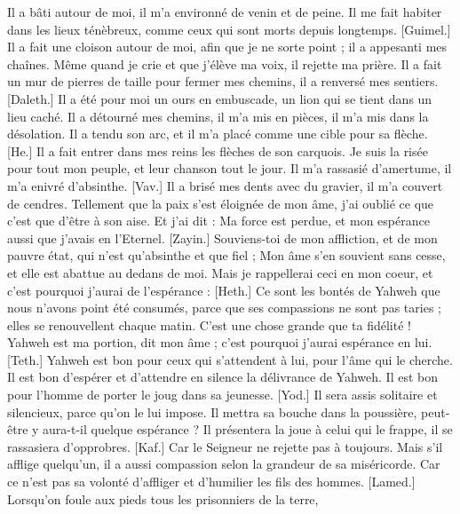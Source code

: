 \begin{multicols}{2}
Il a bâti autour de moi, il m’a environné de venin et de peine.
Il me fait habiter dans les lieux ténèbreux, comme ceux qui sont morts depuis longtemps.
[Guimel.] Il a fait une cloison autour de moi, afin que je ne sorte point ; il a appesanti mes chaînes.
Même quand je crie et que j’élève ma voix, il rejette ma prière.
Il a fait un mur de pierres de taille pour fermer mes chemins, il a renversé mes sentiers.
[Daleth.] Il a été pour moi un ours en embuscade, un lion qui se tient dans un lieu caché.
Il a détourné mes chemins, il m’a mis en pièces, il m’a mis dans la désolation.
Il a tendu son arc, et il m’a placé comme une cible pour sa flèche.
[He.] Il a fait entrer dans mes reins les flèches de son carquois.
Je suis la risée pour tout mon peuple, et leur chanson tout le jour.
Il m’a rassasié d’amertume, il m’a enivré d’absinthe.
[Vav.] Il a brisé mes dents avec du gravier, il m’a couvert de cendres.
Tellement que la paix s’est éloignée de mon âme, j’ai oublié ce que c’est que d’être à son aise.
Et j’ai dit : Ma force est perdue, et mon espérance aussi que j’avais en l’Eternel.
[Zayin.] Souviens-toi de mon affliction, et de mon pauvre état, qui n’est qu’absinthe et que fiel ;
Mon âme s’en souvient sans cesse, et elle est abattue au dedans de moi.
Mais je rappellerai ceci en mon coeur, et c’est pourquoi j’aurai de l'espérance :
[Heth.] Ce sont les bontés de Yahweh que nous n’avons point été consumés, parce que ses compassions ne sont pas taries ;
elles se renouvellent chaque matin. C’est une chose grande que ta fidélité !
Yahweh est ma portion, dit mon âme ; c’est pourquoi j’aurai espérance en lui.
[Teth.] Yahweh est bon pour ceux qui s’attendent à lui, pour l’âme qui le cherche.
Il est bon d'espérer et d'attendre en silence la délivrance de Yahweh.
Il est bon pour l’homme de porter le joug dans sa jeunesse.
[Yod.] Il sera assis solitaire et silencieux, parce qu'on le lui impose.
Il mettra sa bouche dans la poussière, peut-être y aura-t-il quelque espérance ?
Il présentera la joue à celui qui le frappe, il se rassasiera d’opprobres.
[Kaf.] Car le Seigneur ne rejette pas à toujours.
Mais s’il afflige quelqu’un, il a aussi compassion selon la grandeur de sa miséricorde.
Car ce n’est pas sa volonté d'affliger et d'humilier les fils des hommes.
[Lamed.] Lorsqu’on foule aux pieds tous les prisonniers de la terre,

\end{multicols}
